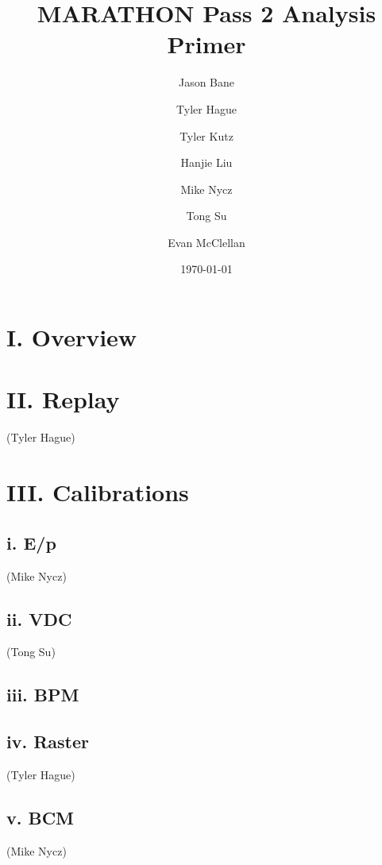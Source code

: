 \documentclass[letterpaper,aps,prl,superscriptaddress,floatfix,twocolumn]{revtex4}
\begin{document}
\title{MARATHON Pass 2 Analysis Primer}

\author{Jason Bane}
\author{Tyler Hague}
\author{Tyler Kutz}
\author{Hanjie Liu}
\author{Mike Nycz}
\author{Tong Su}

\author{Evan McClellan}


\date{\today}

\begin{abstract}
\end{abstract}

\maketitle

\section{I. Overview}

\section{II. Replay}
 (Tyler Hague)

\section{III. Calibrations}

 \subsection{i. E/p}
 (Mike Nycz)

 \subsection{ii. VDC}
(Tong Su)
%

 \subsection{iii. BPM}


 \subsection{iv. Raster}
 (Tyler Hague)
 

 \subsection{v. BCM}
 (Mike Nycz)
 
\end{document}
